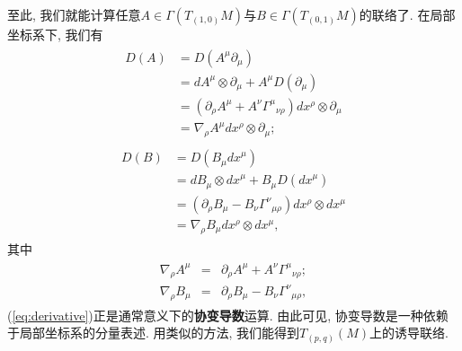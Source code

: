 至此, 我们就能计算任意$A\in \varGamma(T_{(1, 0)}M)$与$B\in \varGamma(T_{(0, 1)}M)$的联络了. 在局部坐标系下, 我们有
\begin{eqnarray}
  \begin{aligned}
    D(A)&=D(A^\mu\partial_\mu)\\
    &=dA^\mu\otimes\partial_\mu+A^{\mu}D(\partial_\mu)\\
    &=(\partial_{\rho}A^\mu+A^{\nu}{\varGamma^\mu}_{\nu\rho})dx^\rho{\otimes}\partial_\mu\\
    &=\nabla_{\rho}A^{\mu}dx^\rho{\otimes}\partial_\mu;
  \end{aligned}
\end{eqnarray}
\begin{eqnarray}
  \begin{aligned}
    D(B)&=D(B_{\mu}{dx}^\mu)\\
    &=dB_\mu\otimes{dx}^\mu+B_{\mu}D({dx}^\mu)\\
    &=(\partial_{\rho}B_\mu-B_\nu{\varGamma^\nu}_{\mu\rho})dx^\rho{\otimes}dx^\mu\\
    &=\nabla_{\rho}B_{\mu}dx^\rho{\otimes}dx^\mu,
  \end{aligned}
\end{eqnarray}
其中
\begin{eqnarray}\label{eq:derivative}
  \begin{aligned}
    \nabla_{\rho}A^\mu&=&\partial_{\rho}A^\mu+A^{\nu}{\varGamma^\mu}_{\nu\rho};\\
    \nabla_{\rho}B_{\mu}&=&\partial_{\rho}B_\mu-B_\nu{\varGamma^\nu}_{\mu\rho},
  \end{aligned}
\end{eqnarray}
(\ref{eq:derivative})正是通常意义下的\textbf{协变导数}运算. 由此可见, 协变导数是一种依赖于局部坐标系的分量表述. 用类似的方法, 我们能得到$T_{(p, q)}(M)$上的诱导联络.

